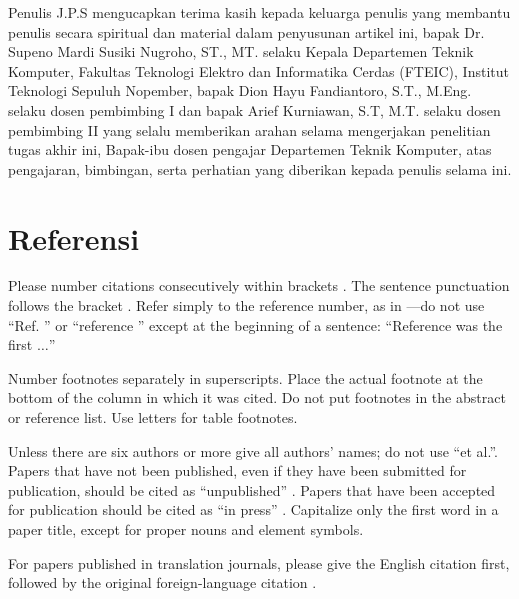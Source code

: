 \documentclass[conference]{IEEEtran}
\begin{document}
Penulis J.P.S mengucapkan terima kasih kepada keluarga penulis yang membantu penulis secara spiritual dan material dalam penyusunan artikel ini, 
bapak Dr. Supeno Mardi Susiki Nugroho, ST., MT. selaku Kepala Departemen Teknik Komputer, Fakultas Teknologi Elektro dan Informatika Cerdas (FTEIC), Institut Teknologi Sepuluh Nopember, 
bapak Dion Hayu Fandiantoro, S.T., M.Eng. selaku dosen pembimbing I dan bapak Arief Kurniawan, S.T, M.T. selaku dosen pembimbing II yang selalu memberikan arahan selama mengerjakan penelitian tugas akhir ini, 
Bapak-ibu dosen pengajar Departemen Teknik Komputer, atas pengajaran, bimbingan, serta perhatian yang diberikan kepada penulis selama ini.

\section*{Referensi}

Please number citations consecutively within brackets \cite{b1}. The 
sentence punctuation follows the bracket \cite{b2}. Refer simply to the reference 
number, as in \cite{b3}---do not use ``Ref. \cite{b3}'' or ``reference \cite{b3}'' except at 
the beginning of a sentence: ``Reference \cite{b3} was the first $\ldots$''

Number footnotes separately in superscripts. Place the actual footnote at 
the bottom of the column in which it was cited. Do not put footnotes in the 
abstract or reference list. Use letters for table footnotes.

Unless there are six authors or more give all authors' names; do not use 
``et al.''. Papers that have not been published, even if they have been 
submitted for publication, should be cited as ``unpublished'' \cite{b4}. Papers 
that have been accepted for publication should be cited as ``in press'' \cite{b5}. 
Capitalize only the first word in a paper title, except for proper nouns and 
element symbols.

For papers published in translation journals, please give the English 
citation first, followed by the original foreign-language citation \cite{b6}.
\end{document}
